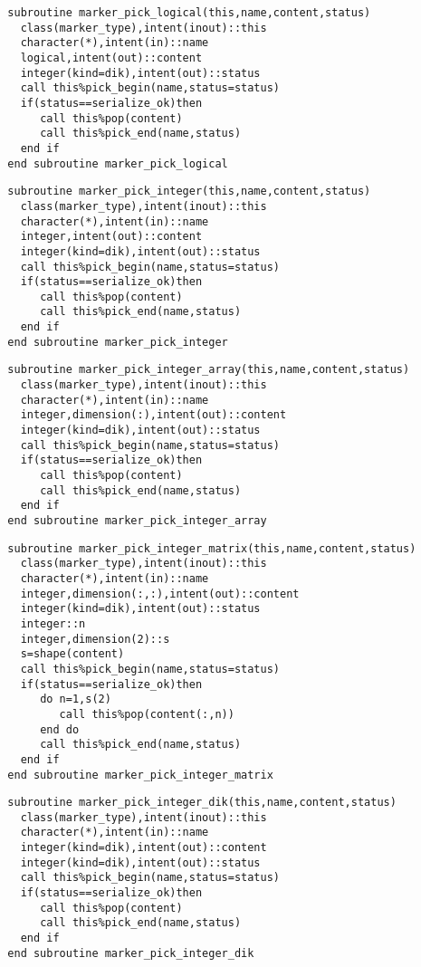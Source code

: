 \begin{Verbatim}
  subroutine marker_pick_logical(this,name,content,status)
    class(marker_type),intent(inout)::this
    character(*),intent(in)::name
    logical,intent(out)::content
    integer(kind=dik),intent(out)::status
    call this%pick_begin(name,status=status)
    if(status==serialize_ok)then
       call this%pop(content)
       call this%pick_end(name,status)
    end if
  end subroutine marker_pick_logical
\end{Verbatim}

\begin{Verbatim}
  subroutine marker_pick_integer(this,name,content,status)
    class(marker_type),intent(inout)::this
    character(*),intent(in)::name
    integer,intent(out)::content
    integer(kind=dik),intent(out)::status
    call this%pick_begin(name,status=status)
    if(status==serialize_ok)then
       call this%pop(content)
       call this%pick_end(name,status)
    end if
  end subroutine marker_pick_integer
\end{Verbatim}

\begin{Verbatim}
  subroutine marker_pick_integer_array(this,name,content,status)
    class(marker_type),intent(inout)::this
    character(*),intent(in)::name
    integer,dimension(:),intent(out)::content
    integer(kind=dik),intent(out)::status
    call this%pick_begin(name,status=status)
    if(status==serialize_ok)then
       call this%pop(content)
       call this%pick_end(name,status)
    end if
  end subroutine marker_pick_integer_array
\end{Verbatim}

\begin{Verbatim}
  subroutine marker_pick_integer_matrix(this,name,content,status)
    class(marker_type),intent(inout)::this
    character(*),intent(in)::name
    integer,dimension(:,:),intent(out)::content
    integer(kind=dik),intent(out)::status
    integer::n
    integer,dimension(2)::s
    s=shape(content)
    call this%pick_begin(name,status=status)
    if(status==serialize_ok)then
       do n=1,s(2)
          call this%pop(content(:,n))
       end do
       call this%pick_end(name,status)
    end if
  end subroutine marker_pick_integer_matrix
\end{Verbatim}

\begin{Verbatim}
  subroutine marker_pick_integer_dik(this,name,content,status)
    class(marker_type),intent(inout)::this
    character(*),intent(in)::name
    integer(kind=dik),intent(out)::content
    integer(kind=dik),intent(out)::status
    call this%pick_begin(name,status=status)
    if(status==serialize_ok)then
       call this%pop(content)
       call this%pick_end(name,status)
    end if
  end subroutine marker_pick_integer_dik
\end{Verbatim}

